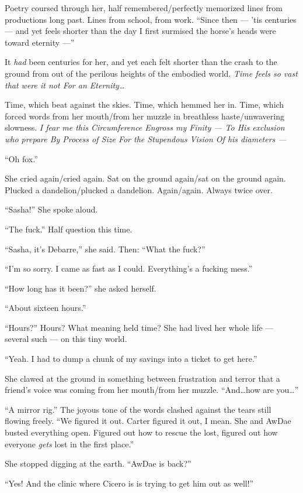 Poetry coursed through her, half remembered/perfectly memorized lines from productions long past. Lines from school, from work. ``Since then — 'tis centuries — and yet feels shorter than the day I first surmised the horse's heads were toward eternity —''

It \emph{had} been centuries for her, and yet each felt shorter than the crash to the ground from out of the perilous heights of the embodied world. \emph{Time feels so vast that were it not For an Eternity\ldots{}}

Time, which beat against the skies. Time, which hemmed her in. Time, which forced words from her mouth/from her muzzle in breathless haste/unwavering slowness. \emph{I fear me this Circumference Engross my Finity — To His exclusion who prepare By Process of Size For the Stupendous Vision Of his diameters —}

``Oh fox.''

She cried again/cried again. Sat on the ground again/sat on the ground again. Plucked a dandelion/plucked a dandelion. Again/again. Always twice over.

``Sasha!'' She spoke aloud.

``The fuck.'' Half question this time.

``Sasha, it's Debarre,'' she said. Then: ``What the fuck?''

``I'm so sorry. I came as fast as I could. Everything's a fucking mess.''

``How long has it been?'' she asked herself.

``About sixteen hours.''

``Hours?'' Hours? What meaning held time? She had lived her whole life — several such — on this tiny world.

``Yeah. I had to dump a chunk of my savings into a ticket to get here.''

She clawed at the ground in something between frustration and terror that a friend's voice was coming from her mouth/from her muzzle. ``And\ldots{}how are you\ldots{}''

``A mirror rig.'' The joyous tone of the words clashed against the tears still flowing freely. ``We figured it out. Carter figured it out, I mean. She and AwDae busted everything open. Figured out how to rescue the lost, figured out how everyone \emph{gets} lost in the first place.''

She stopped digging at the earth. ``AwDae is back?''

``Yes! And the clinic where Cicero is is trying to get him out as well!''

